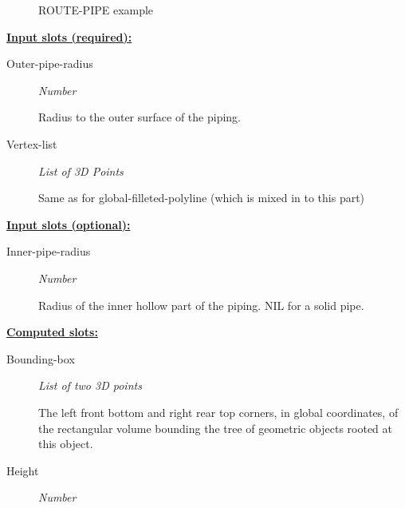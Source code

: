 \documentclass [11pt]{book}
\begin{document}
\begin{itemize}
\begin{figure}
\caption{ROUTE-PIPE example}

\label{fig:ROUTE-PIPE}

\end{figure}





\textbf{
\underline{Input slots (required):}}

\begin{description}

\item [Outer-pipe-radius]
\emph{Number}

 Radius to the outer surface of the piping.




\item [Vertex-list]
\emph{List of 3D Points}

 Same as for global-filleted-polyline (which is mixed in to this part)




\end{description}






\textbf{
\underline{Input slots (optional):}}

\begin{description}

\item [Inner-pipe-radius]
\emph{Number}

 Radius of the inner hollow part of the piping. NIL for a solid pipe.




\end{description}






\textbf{
\underline{Computed slots:}}

\begin{description}

\item [Bounding-box]
\emph{List of two 3D points}

 The left front bottom and right rear top corners, in global coordinates,
of the rectangular volume bounding the tree of geometric objects rooted at this object.




\item [Height]
\emph{Number}


\end{description}
\end{itemize}
\end{document}

